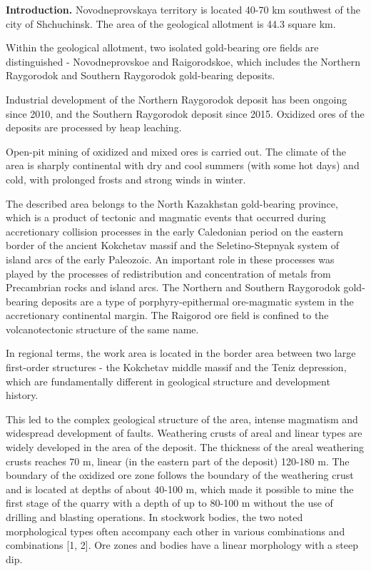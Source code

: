 \begin{multicols}{2}
{\bfseries Introduction.} Novodneprovskaya territory is located 40-70 km
southwest of the city of Shchuchinsk. The area of the geological
allotment is 44.3 square km.

Within the geological allotment, two isolated gold-bearing ore fields
are distinguished - Novodneprovskoe and Raigorodskoe, which includes the
Northern Raygorodok and Southern Raygorodok gold-bearing deposits.

Industrial development of the Northern Raygorodok deposit has been
ongoing since 2010, and the Southern Raygorodok deposit since 2015.
Oxidized ores of the deposits are processed by heap leaching.

Open-pit mining of oxidized and mixed ores is carried out. The climate
of the area is sharply continental with dry and cool summers (with some
hot days) and cold, with prolonged frosts and strong winds in winter.

The described area belongs to the North Kazakhstan gold-bearing
province, which is a product of tectonic and magmatic events that
occurred during accretionary collision processes in the early Caledonian
period on the eastern border of the ancient Kokchetav massif and the
Seletino-Stepnyak system of island arcs of the early Paleozoic. An
important role in these processes was played by the processes of
redistribution and concentration of metals from Precambrian rocks and
island arcs. The Northern and Southern Raygorodok gold-bearing deposits
are a type of porphyry-epithermal ore-magmatic system in the
accretionary continental margin. The Raigorod ore field is confined to
the volcanotectonic structure of the same name.

In regional terms, the work area is located in the border area between
two large first-order structures - the Kokchetav middle massif and the
Teniz depression, which are fundamentally different in geological
structure and development history.

This led to the complex geological structure of the area, intense
magmatism and widespread development of faults. Weathering crusts of
areal and linear types are widely developed in the area of the deposit.
The thickness of the areal weathering crusts reaches 70 m, linear (in
the eastern part of the deposit) 120-180 m. The boundary of the oxidized
ore zone follows the boundary of the weathering crust and is located at
depths of about 40-100 m, which made it possible to mine the first stage
of the quarry with a depth of up to 80-100 m without the use of drilling
and blasting operations. In stockwork bodies, the two noted
morphological types often accompany each other in various combinations
and combinations {[}1, 2{]}. Ore zones and bodies have a linear
morphology with a steep dip.


\end{multicols}
